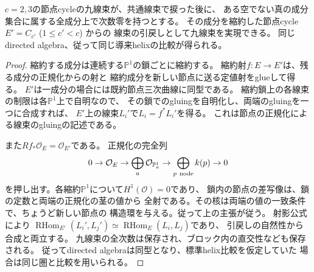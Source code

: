 \begin{lemma}[共通次数零成分の縮約]
\label{lem:ou-nodal-contract-common-zero}
$c=2,3$の節点cycleの九線束が、共通線束で捩った後に、
ある空でない真の成分集合に属する全成分上で次数零を持つとする。
その成分を縮約した節点cycle $E'=C_{c'}$ ($1\leq c'<c$) からの
線束の引戻しとして九線束を実現できる。
同じdirected algebra、従って同じ導来helixの比較が得られる。
\end{lemma}
\begin{proof}
縮約する成分は連続する$\mathbb P^1$の鎖ごとに縮約する。
縮約射$f:E\to E'$は、残る成分の正規化からの射と
縮約成分を新しい節点に送る定値射をglueして得る。
$E'$は一成分の場合には既約節点三次曲線に同型である。
縮約鎖上の各線束の制限は各$\mathbb P^1$上で自明なので、
その鎖でのgluingを自明化し、両端のgluingを一つに合成すれば、
$E'$上の線束$L_i'$で$L_i=f^*L_i'$を得る。
これは節点の正規化による線束のgluingの記述である。

また$Rf_*\mathcal O_E=\mathcal O_{E'}$である。
正規化の完全列
\[
 0\to\mathcal O_E\to\bigoplus_a\mathcal O_{\mathbb P^1_a}
 \to\bigoplus_{p\ {\rm node}} k(p)\to0
\]
を押し出す。各縮約$\mathbb P^1$について$H^1(\mathcal O)=0$であり、
鎖内の節点の差写像は、鎖の定数と両端の正規化の茎の値から
全射である。その核は両端の値の一致条件で、ちょうど新しい節点の
構造環を与える。従って上の主張が従う。
射影公式により
$\operatorname{RHom}_{E'}(L_i',L_j')\simeq
\operatorname{RHom}_{E}(L_i,L_j)$であり、
引戻しの自然性から合成と両立する。
九線束の全次数は保存され、ブロック内の直交性なども保存される。
従ってdirected algebraは同型となり、標準helix比較を仮定していた
場合は同じ圏と比較を用いられる。
\end{proof}

